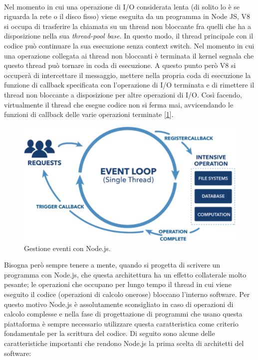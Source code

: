 \\Nel momento in cui una operazione di I/O considerata lenta (di solito lo è se riguarda la rete o il disco fisso) viene eseguita da un programma in Node JS, V8 si occupa di trasferire la chiamata su un thread non bloccante fra quelli che ha a disposizione nella sua \textit{thread-pool base}. In questo modo, il thread principale con il codice può continuare la sua esecuzione senza context switch. Nel momento in cui una operazione collegata ai thread non bloccanti è terminata il kernel segnala che questo thread può tornare in coda di esecuzione. A questo punto però V8 si occuperà di intercettare il messaggio, mettere nella propria coda di esecuzione la funzione di callback specificata con l'operazione di I/O terminata e di rimettere il thread non bloccante a disposizione per altre operazioni di I/O. Così facendo, virtualmente il thread che esegue codice non si ferma mai, avvicendando le funzioni di callback delle varie operazioni terminate [\ref{fig:nodeEvent}].
\begin{figure}[H]
	\centering
	\includegraphics[width=\textwidth]{images/nodeEvent.png}
	\caption{Gestione eventi con Node.js.}
	\label{fig:nodeEvent}
\end{figure}
Bisogna però sempre tenere a mente, quando si progetta di scrivere un programma con Node.js, che questa architettura ha un effetto collaterale molto pesante; le operazioni che occupano per lungo tempo il thread in cui viene eseguito il codice (operazioni di calcolo onerose) bloccano l'interno software. Per questo motivo Node.js è assolutamente sconsigliato in caso di operazioni di calcolo complesse e nella fase di progettazione di programmi che usano questa piattaforma è sempre necessario utilizzare questa caratteristica come criterio fondamentale per la scrittura del codice.
Di seguito sono alcune delle caratteristiche importanti che rendono Node.js la prima scelta di architetti del software:

